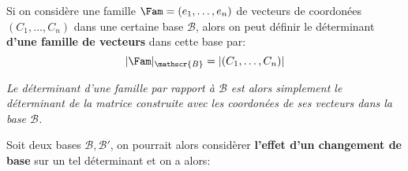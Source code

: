 Si on considère une famille \(\Fam = (e_1 , \ldots, e_n)\) de vecteurs de coordonées \((C_1, \ldots, C_n)\) dans une certaine base \(\mathscr{B}\), alors on peut définir le déterminant \textbf{d'une famille de vecteurs} dans cette base par:
\[
   |\Fam|_{\mathscr{B}} = |(C_1, \ldots, C_n)|
\]
\begin{center}
   \textit{Le déterminant d'une famille par rapport à \(\mathscr{B}\) est alors simplement le déterminant de la matrice construite avec les coordonées de ses vecteurs dans la base \(\mathscr{B}\).}
\end{center}

Soit deux bases \(\mathscr{B, B'}\), on pourrait alors considèrer \textbf{l'effet d'un changement de base} sur un tel déterminant et on a alors:

\subsection*{}


